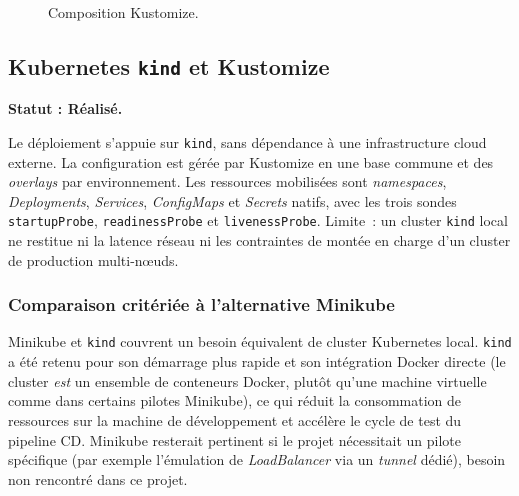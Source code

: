\begin{figure}[htbp]
\centering
\scriptsize
{}
\caption{Composition Kustomize.}
\label{fig:kustomize_overlays}
\end{figure}

\subsection{Kubernetes \texttt{kind} et Kustomize}
\textbf{Statut : Réalisé.}

Le déploiement s'appuie sur \texttt{kind}, sans dépendance à une infrastructure cloud externe. La configuration est gérée par Kustomize en une base commune et des \textit{overlays} par environnement. Les ressources mobilisées sont \textit{namespaces}, \textit{Deployments}, \textit{Services}, \textit{ConfigMaps} et \textit{Secrets} natifs, avec les trois sondes \texttt{startupProbe}, \texttt{readinessProbe} et \texttt{livenessProbe}. Limite~: un cluster \texttt{kind} local ne restitue ni la latence réseau ni les contraintes de montée en charge d'un cluster de production multi-nœuds.

\subsubsection{Comparaison critériée à l'alternative Minikube}
Minikube et \texttt{kind} couvrent un besoin équivalent de cluster Kubernetes local. \texttt{kind} a été retenu pour son démarrage plus rapide et son intégration Docker directe (le cluster \emph{est} un ensemble de conteneurs Docker, plutôt qu'une machine virtuelle comme dans certains pilotes Minikube), ce qui réduit la consommation de ressources sur la machine de développement et accélère le cycle de test du pipeline CD. Minikube resterait pertinent si le projet nécessitait un pilote spécifique (par exemple l'émulation de \textit{LoadBalancer} via un \textit{tunnel} dédié), besoin non rencontré dans ce projet.

